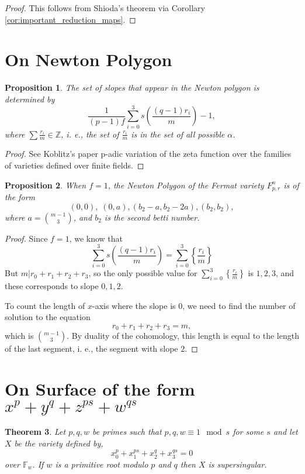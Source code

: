 \documentclass{article}
\newcommand{\Z}{\mathbb{Z}}
\newcommand{\finfield}[1]{\mathbb{F}_{#1}}
\newtheorem{theorem}{Theorem}[section]
\newtheorem{proposition}[theorem]{Proposition}
\theoremstyle{definition}
\theoremstyle{definition}
\theoremstyle{remark}
\begin{document}
\begin{proof}
This follows from Shioda's theorem via Corollary \ref{cor:important_reduction_maps}.
\end{proof}

\section{On Newton Polygon}
\begin{proposition}
The set of slopes that appear in the Newton polygon is determined by 
\[\frac{1}{(p-1) f}\sum_{i = 0}^3 s(\frac{(q-1) r_i}{m}) - 1,\]
where $\sum \frac{r_i}{m} \in \Z$, i. e., the set of $\frac{r_i}{m}$ is in the set of all possible $\alpha$.
\end{proposition}
\begin{proof}
See Koblitz's paper p-adic variation of the zeta function over the families of varieties defined over finite fields. 
\end{proof}

\begin{proposition}
When $f = 1$, the Newton Polygon of the Fermat variety $F_{p, r}^n$ is of the form \[(0, 0),\; (0, a), (b_2 - a, b_2 - 2a), (b_2, b_2),\] 
where $a = \binom{m-1}{3}$, and $b_2$ is the second betti number.
\end{proposition}
\begin{proof}
Since $f = 1$, we know that \[\sum_{i = 0}^3 s(\frac{(q-1) r_i}{m}) = \sum_{i = 0}^3 \left\{  \frac{r_i}{m}  \right\} \]
But $m | r_0 +  r_1 + r_2 + r_3$, so the only possible value for $\sum_{i = 0}^3 \left\{  \frac{r_i}{m}  \right\} $ is $1, 2, 3$, and these corresponds to slope $0, 1, 2$. 

To count the length of $x$-axis where the slope is $0$, we need to find the number of solution to the equation \[r_0 + r_1 + r_2 + r_3 = m,\] which is $\binom{m-1}{3}$. By duality of the cohomology, this length is equal to the length of the last segment, i. e., the segment with slope $2$.
\end{proof}

\section{On Surface of the form $x^p + y^q + z^{ps} + w^{qs}$}

\begin{theorem}
Let $p, q, w$ be primes such that $p, q, w \equiv 1 \mod{s}$ for some $s$ and let $X$ be the variety defined by,
\[ x_0^p + x_1^{ps} + x_2^{q} + x_3^{qs} = 0 \]
over $\finfield{w}$. If $w$ is a primitive root modulo $p$ and $q$ then $X$ is supersingular.  
\end{theorem}
\end{document}
